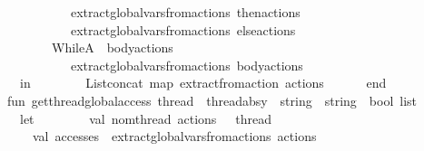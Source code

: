 \begin{isabellebody}
\ \ \ \ \ \ \ \ \ \ \ \ \ \ {\isacharparenleft}{\kern0pt}extract{\isacharunderscore}{\kern0pt}global{\isacharunderscore}{\kern0pt}vars{\isacharunderscore}{\kern0pt}from{\isacharunderscore}{\kern0pt}actions\ then{\isacharunderscore}{\kern0pt}actions{\isacharparenright}{\kern0pt}\ {\isacharat}{\kern0pt}\ \isanewline
\ \ \ \ \ \ \ \ \ \ \ \ \ \ {\isacharparenleft}{\kern0pt}extract{\isacharunderscore}{\kern0pt}global{\isacharunderscore}{\kern0pt}vars{\isacharunderscore}{\kern0pt}from{\isacharunderscore}{\kern0pt}actions\ else{\isacharunderscore}{\kern0pt}actions{\isacharparenright}{\kern0pt}\isanewline
\ \ \ \ \ \ \ \ \ \ {\isacharbar}{\kern0pt}\ WhileA\ {\isacharparenleft}{\kern0pt}{\isacharunderscore}{\kern0pt}{\isacharcomma}{\kern0pt}\ body{\isacharunderscore}{\kern0pt}actions{\isacharparenright}{\kern0pt}\ {\isacharequal}{\kern0pt}{\isachargreater}{\kern0pt}\isanewline
\ \ \ \ \ \ \ \ \ \ \ \ \ \ extract{\isacharunderscore}{\kern0pt}global{\isacharunderscore}{\kern0pt}vars{\isacharunderscore}{\kern0pt}from{\isacharunderscore}{\kern0pt}actions\ body{\isacharunderscore}{\kern0pt}actions\isanewline
\ \ \ \ \ \ \ \ \ \ {\isacharbar}{\kern0pt}\ {\isacharunderscore}{\kern0pt}\ {\isacharequal}{\kern0pt}{\isachargreater}{\kern0pt}\ {\isacharbrackleft}{\kern0pt}{\isacharbrackright}{\kern0pt}\isanewline
\ \ \ \ \ \ in\isanewline
\ \ \ \ \ \ \ \ List{\isachardot}{\kern0pt}concat\ {\isacharparenleft}{\kern0pt}map\ extract{\isacharunderscore}{\kern0pt}from{\isacharunderscore}{\kern0pt}action\ actions{\isacharparenright}{\kern0pt}\isanewline
\ \ \ \ \ \ end\isanewline
\ \ \ \ \isanewline
\ \ \ \ fun\ get{\isacharunderscore}{\kern0pt}thread{\isacharunderscore}{\kern0pt}global{\isacharunderscore}{\kern0pt}access\ {\isacharparenleft}{\kern0pt}thread\ {\isacharcolon}{\kern0pt}\ thread{\isacharunderscore}{\kern0pt}absy{\isacharparenright}{\kern0pt}\ {\isacharcolon}{\kern0pt}\ string\ {\isacharasterisk}{\kern0pt}\ {\isacharparenleft}{\kern0pt}string\ {\isacharasterisk}{\kern0pt}\ bool{\isacharparenright}{\kern0pt}\ list\ {\isacharequal}{\kern0pt}\isanewline
\ \ \ \ \ \ let\isanewline
\ \ \ \ \ \ \ \ val\ {\isacharbraceleft}{\kern0pt}nom{\isacharunderscore}{\kern0pt}thread{\isacharcomma}{\kern0pt}\ actions{\isacharcomma}{\kern0pt}\ {\isachardot}{\kern0pt}{\isachardot}{\kern0pt}{\isachardot}{\kern0pt}{\isacharbraceright}{\kern0pt}\ {\isacharequal}{\kern0pt}\ thread\isanewline
\ \ \ \ \ \ \ \ val\ accesses\ {\isacharequal}{\kern0pt}\ extract{\isacharunderscore}{\kern0pt}global{\isacharunderscore}{\kern0pt}vars{\isacharunderscore}{\kern0pt}from{\isacharunderscore}{\kern0pt}actions\ actions\isanewline

\end{isabellebody}
